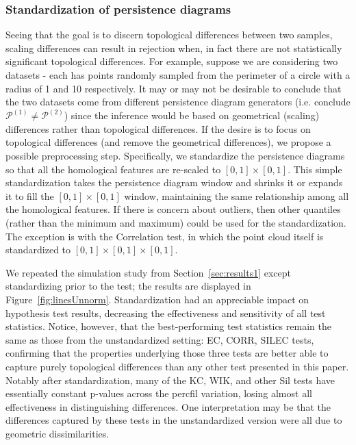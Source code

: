 \documentclass[12pt]{article}
\newcommand{\figref}[1]{Figure~\ref{#1}}
\begin{document}
\subsubsection{Standardization of persistence diagrams} \label{sec:standardize}
Seeing that the goal is to discern topological differences between two samples, scaling differences can result in rejection when, in fact there are not statistically significant topological differences. For example, suppose we are considering two datasets - each has points randomly sampled from the perimeter of a circle with a radius of 1 and 10 respectively.  It may or may not be desirable to conclude that the two datasets come from different persistence diagram generators (i.e. conclude $\mathcal P^{(1)} \neq \mathcal P^{(2)}$) since the inference would be based on geometrical (scaling) differences rather than topological differences.  If the desire is to focus on topological differences (and remove the geometrical differences), we propose a possible preprocessing step. Specifically, we standardize the persistence diagrams so that all the homological features are re-scaled to $[0, 1]\times[0,1]$. This simple standardization takes the persistence diagram window and shrinks it or expands it to fill the $[0, 1]\times[0,1]$ window, maintaining the same relationship among all the homological features.  If there is concern about outliers, then other quantiles (rather than the minimum and maximum) could be used for the standardization. The exception is with the Correlation test, in which the point cloud itself is standardized to $[0, 1]\times[0, 1]\times[0, 1]$.

We repeated the simulation study from Section~\ref{sec:results1} except standardizing prior to the test; the results are displayed in \figref{fig:linesUnnorm}. Standardization had an appreciable impact on hypothesis test results, decreasing the effectiveness and sensitivity of all test statistics. Notice, however, that the best-performing test statistics remain the same as those from the unstandardized setting: EC, CORR, SILEC tests, confirming that the properties underlying those three tests are better able to capture purely topological differences than any other test presented in this paper. Notably after standardization, many of the KC, WIK, and other Sil tests have essentially constant p-values across the percfil variation, losing almost all effectiveness in distinguishing differences. One interpretation may be that the differences captured by these tests in the unstandardized version were all due to geometric dissimilarities.
\end{document}
